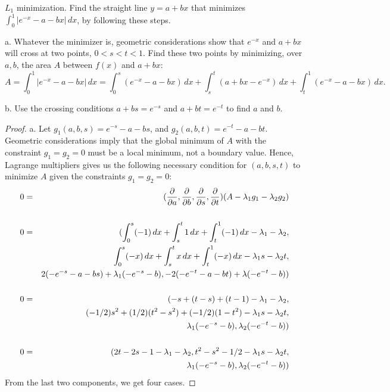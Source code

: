\documentclass{article}
\begin{document}
 $L_1$ minimization. Find the straight line $y = a + bx$ that minimizes  $\int_0^1|e^{-x} - a - bx| \, dx$, by following these steps.

a. Whatever the minimizer is, geometric considerations show that $e^{-x}$ and $a+bx$ will cross at two points, $0 < s < t < 1$. Find these two points by minimizing, over $a,b$, the area $A$ between $f(x)$ and $a+bx$:
$$A=\int_0^1 |e^{-x} - a -bx| \, dx = \int_0^s (e^{-x} - a -bx)\,dx + \int_s^t (a+bx-e^{-x}) \,dx +  \int_t^1(e^{-x} - a - bx) \,dx.$$

b. Use the crossing conditions $a + bs = e^{-s}$ and $a + bt = e^{-t}$ to find $a$ and $b$.

\begin{proof}

a. Let $g_1(a,b,s) = e^{-s} - a - bs$, and $g_2(a,b,t) = e^{-t} - a - bt$. Geometric considerations imply that the global minimum of $A$ with the constraint $g_1 = g_2 = 0$ must be a local minimum, not a boundary value. Hence, Lagrange multipliers gives us the following necessary condition for $(a,b,s,t)$ to minimize $A$ given the constraints $g_1 = g_2 = 0$:
\begin{align}
 0      & = &  (\frac{\partial}{\partial a}, \frac{\partial}{\partial b}, \frac{\partial}{\partial s}, \frac{\partial}{\partial t}) (A - \lambda_1 g_1 - \lambda_2 g_2) \nonumber
\\ \nonumber
\\ 0     & = & ( \int_0^s  (-1) \,dx + \int_s^t 1 \,dx + \int_t^1 (-1) \, dx  - \lambda_1 - \lambda_2 , \nonumber
\\ & &                \int_0^s  (-x) \,dx + \int_s^t x \,dx + \int_t^1 (-x) \, dx  - \lambda_1 s - \lambda_2 t, \nonumber
\\ & &           2(-e^{-s} - a -bs)  + \lambda_1(-e^{-s} - b),
                - 2(-e^{-t} - a - bt) + \lambda(-e^{-t} - b)) \nonumber
\\ \nonumber
\\  0    & = & ( -s + (t - s) + (t - 1) - \lambda_1 - \lambda_2, \nonumber
\\ & &            (-1/2)s^2  + (1/2)(t^2 - s^2)  + (-1/2) (1 - t^2) - \lambda_1 s - \lambda_2 t, \nonumber
\\ & &          \lambda_1(-e^{-s} - b),
                \lambda_2(-e^{-t} - b)) \nonumber
\\ \nonumber
\\ 0    & = & ( 2t - 2s - 1 - \lambda_1 - \lambda_2, t^2 - s^2 - 1/2  - \lambda_1 s - \lambda_2 t, \nonumber
\\ & &  \lambda_1(-e^{-s} - b), \lambda_2(-e^{-t} - b) ) \label{eq1}
\end{align}
From the last two components, we get four cases.


\end{proof}
\end{document}
